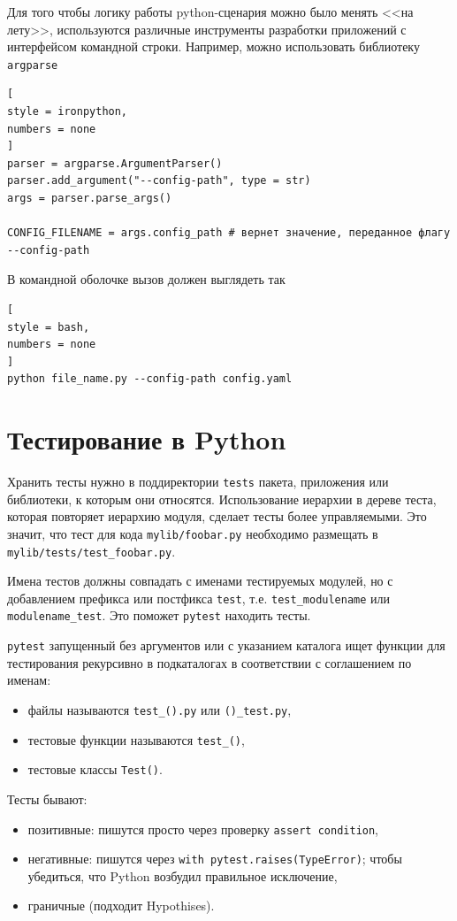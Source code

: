 \documentclass[%
	11pt,
	a4paper,
	utf8,
		]{article}
\begin{document}
Для того чтобы логику работы python-сценария можно было менять <<на лету>>, используются различные инструменты разработки приложений с интерфейсом командной строки. Например, можно использовать библиотеку \texttt{argparse} 
\begin{lstlisting}[
style = ironpython,
numbers = none	
]
parser = argparse.ArgumentParser()
parser.add_argument("--config-path", type = str)
args = parser.parse_args()

CONFIG_FILENAME = args.config_path # вернет значение, переданное флагу --config-path
\end{lstlisting}

В командной оболочке вызов должен выглядеть так
\begin{lstlisting}[
style = bash,
numbers = none
]
python file_name.py --config-path config.yaml
\end{lstlisting}


\section{Тестирование в Python}

Хранить тесты нужно в поддиректории \texttt{tests} пакета, приложения или библиотеки, к которым они относятся. Использование иерархии в дереве теста, которая повторяет иерархию модуля, сделает тесты более управляемыми. Это значит, что тест для кода \texttt{mylib/foobar.py} необходимо размещать в \texttt{mylib/tests/test\_foobar.py}. 

Имена тестов должны совпадать с именами тестируемых модулей, но с добавлением префикса или постфикса \texttt{test}, т.е. \texttt{test\_modulename} или \texttt{modulename\_test}. Это поможет \texttt{pytest} находить тесты.

\texttt{pytest} запущенный без аргументов или с указанием каталога ищет функции для тестирования рекурсивно в подкаталогах в соответствии с соглашением по именам:
\begin{itemize}
	\item файлы называются \texttt{test\_().py} или \texttt{()\_test.py},
	
	\item тестовые функции называются \texttt{test\_()},
	
	\item тестовые классы \texttt{Test()}.
\end{itemize}

Тесты бывают:
\begin{itemize}
	\item позитивные: пишутся просто через проверку \texttt{assert condition},
	
	\item негативные: пишутся через \texttt{with pytest.raises(TypeError)}; чтобы убедиться, что Python возбудил правильное исключение,
	
	\item граничные (подходит Hypothises).
\end{itemize}
\end{document}

